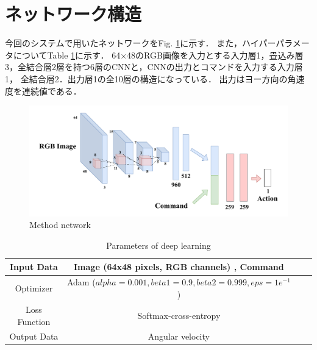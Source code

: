 \newpage
\section{ネットワーク構造}
\label{net}
今回のシステムで用いたネットワークをFig. \ref{fig::methodnetwork}に示す．
また，ハイパーパラメータについてTable \ref{tb::param}に示す．
64×48のRGB画像を入力とする入力層1，畳込み層3，全結合層2層を持つ6層のCNNと，CNNの出力とコマンドを入力する入力層1，
全結合層2．出力層1の全10層の構造になっている．
出力はヨー方向の角速度を連続値である．

\begin{figure}[h]
    \centering
    \includegraphics[width = 13cm]{./figs/network.pdf}
    \caption{Method network}
    \label{fig::methodnetwork}
\end{figure}
\begin{table}[h]
    \centering
    \caption{Parameters of deep learning}
    \begin{tabular}{|c|c|c|c|}
    \hline
    Input Data    & Image (64x48 pixels, RGB channels) , Command                                              \\ \hline
    Optimizer     & Adam ($alpha = 0.001, beta1 = 0.9, beta2 = 0.999, eps = 1e^{-1}$ )  \\ \hline
    Loss Function & Softmax-cross-entropy                                                            \\ \hline
    Output Data   & Angular velocity                                              \\ \hline
    \end{tabular}
    \label{tb::param}
    \end{table}
\newpage





